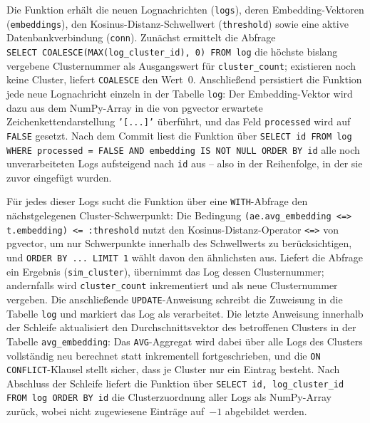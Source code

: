 Die Funktion erhält die neuen Lognachrichten (\texttt{logs}), deren Embedding-Vektoren (\texttt{embeddings}), den Kosinus-Distanz-Schwellwert (\texttt{threshold}) sowie eine aktive Datenbankverbindung (\texttt{conn}). Zunächst ermittelt die Abfrage \\ \texttt{SELECT COALESCE(MAX(log\_cluster\_id), 0) FROM log} die höchste bislang vergebene Clusternummer als Ausgangswert für \texttt{cluster\_count}; existieren noch keine Cluster, liefert \texttt{COALESCE} den Wert~0. Anschließend persistiert die Funktion jede neue Lognachricht einzeln in der Tabelle \texttt{log}: Der Embedding-Vektor wird dazu aus dem NumPy-Array in die von pgvector erwartete Zeichenkettendarstellung \texttt{'[...]'} überführt, und das Feld \texttt{processed} wird auf \texttt{FALSE} gesetzt. Nach dem Commit liest die Funktion über \texttt{SELECT id FROM log WHERE processed = FALSE AND embedding IS NOT NULL ORDER BY id} alle noch unverarbeiteten Logs aufsteigend nach \texttt{id} aus -- also in der Reihenfolge, in der sie zuvor eingefügt wurden.

Für jedes dieser Logs sucht die Funktion über eine \texttt{WITH}-Abfrage den nächstgelegenen Cluster-Schwerpunkt: Die Bedingung \texttt{(ae.avg\_embedding <=> t.embedding) <= :threshold} nutzt den Kosinus-Distanz-Operator \texttt{<=>} von pgvector, um nur Schwerpunkte innerhalb des Schwellwerts zu berücksichtigen, und \texttt{ORDER BY ... LIMIT 1} wählt davon den ähnlichsten aus. Liefert die Abfrage ein Ergebnis (\texttt{sim\_cluster}), übernimmt das Log dessen Clusternummer; andernfalls wird \texttt{cluster\_count} inkrementiert und als neue Clusternummer vergeben. Die anschließende \texttt{UPDATE}-Anweisung schreibt die Zuweisung in die Tabelle \texttt{log} und markiert das Log als verarbeitet. Die letzte Anweisung innerhalb der Schleife aktualisiert den Durchschnittsvektor des betroffenen Clusters in der Tabelle \texttt{avg\_embedding}: Das \texttt{AVG}-Aggregat wird dabei über alle Logs des Clusters vollständig neu berechnet statt inkrementell fortgeschrieben, und die \texttt{ON CONFLICT}-Klausel stellt sicher, dass je Cluster nur ein Eintrag besteht. Nach Abschluss der Schleife liefert die Funktion über \texttt{SELECT id, log\_cluster\_id FROM log ORDER BY id} die Clusterzuordnung aller Logs als NumPy-Array zurück, wobei nicht zugewiesene Einträge auf~$-1$ abgebildet werden.